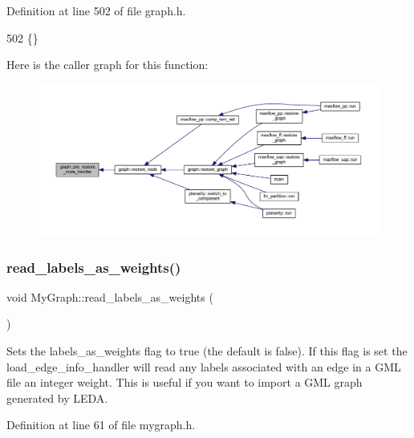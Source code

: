 Definition at line 502 of file graph.\+h.


\begin{DoxyCode}
502 \{\}       
\end{DoxyCode}
Here is the caller graph for this function\+:
\nopagebreak
\begin{figure}[H]
\begin{center}
\leavevmode
\includegraphics[width=350pt]{classgraph_a3a305d240ab5237a2adae315b50105a6_icgraph}
\end{center}
\end{figure}
\mbox{\label{class_my_graph_a5d90ef0fba45bbbdf53a3bfe6f9a7061}} 
\subsubsection{\texorpdfstring{read\+\_\+labels\+\_\+as\+\_\+weights()}{read\_labels\_as\_weights()}}
{\footnotesize\ttfamily void My\+Graph\+::read\+\_\+labels\+\_\+as\+\_\+weights (\begin{DoxyParamCaption}{ }\end{DoxyParamCaption})\hspace{0.3cm}{\ttfamily [inline]}}

Sets the labels\+\_\+as\+\_\+weights flag to true (the default is false). If this flag is set the {\ttfamily load\+\_\+edge\+\_\+info\+\_\+handler} will read any labels associated with an edge in a G\+ML file an integer weight. This is useful if you want to import a G\+ML graph generated by L\+E\+DA. 

Definition at line 61 of file mygraph.\+h.


